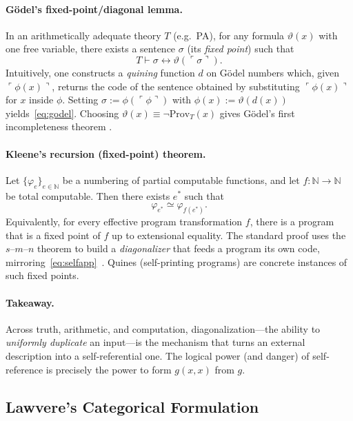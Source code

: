 \documentclass[11pt]{article}
\theoremstyle{upright}
\begin{document}
\paragraph{Gödel's fixed-point/diagonal lemma.}
In an arithmetically adequate theory $T$ (e.g.\ PA), for any formula $\vartheta(x)$ with one free variable, there exists a sentence $\sigma$ (its \emph{fixed point}) such that
\begin{equation}\label{eq:godel}
T \vdash \sigma \leftrightarrow \vartheta(\ulcorner \sigma \urcorner).
\end{equation}
Intuitively, one constructs a \emph{quining} function $d$ on Gödel numbers which, given $\ulcorner \phi(x)\urcorner$, returns the code of the sentence obtained by substituting $\ulcorner \phi(x)\urcorner$ for $x$ inside $\phi$. Setting $\sigma := \phi(\ulcorner \phi \urcorner)$ with $\phi(x) := \vartheta(d(x))$ yields~\eqref{eq:godel}. Choosing $\vartheta(x) \equiv \neg \mathrm{Prov}_T(x)$ gives Gödel's first incompleteness theorem \cite{Godel1931}.

\paragraph{Kleene's recursion (fixed-point) theorem.}
Let $\{\varphi_e\}_{e \in \mathbb{N}}$ be a numbering of partial computable functions, and let $f:\mathbb{N}\to\mathbb{N}$ be total computable. Then there exists $e^\ast$ such that
\begin{equation}\label{eq:kleene}
\varphi_{e^\ast} \simeq \varphi_{f(e^\ast)}.
\end{equation}
Equivalently, for every effective program transformation $f$, there is a program that is a fixed point of $f$ up to extensional equality. The standard proof uses the $s$--$m$--$n$ theorem to build a \emph{diagonalizer} that feeds a program its own code, mirroring~\eqref{eq:selfapp}~\cite{Kleene1938}. Quines (self-printing programs) are concrete instances of such fixed points.

\paragraph{Takeaway.}
Across truth, arithmetic, and computation, diagonalization---the ability to \emph{uniformly duplicate} an input---is the mechanism that turns an external description into a self-referential one. The logical power (and danger) of self-reference is precisely the power to form $g(x,x)$ from $g$.

\subsection{Lawvere’s Categorical Formulation}
\end{document}
